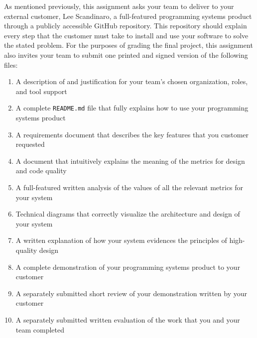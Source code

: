 As mentioned previously, this assignment asks your team to deliver to your external customer, Lee Scandinaro, a
full-featured programming systems product through a publicly accessible GitHub repository. This repository should
explain every step that the customer must take to install and use your software to solve the stated problem. For the
purposes of grading the final project, this assignment also invites your team to submit one printed and signed version
of the following files:

\vspace*{-.1in}
\begin{enumerate}
  \itemsep0em
  \item A description of and justification for your team's chosen organization, roles, and tool support
  \item A complete {\tt README.md} file that fully explains how to use your programming systems product
  \item A requirements document that describes the key features that you customer requested
  \item A document that intuitively explains the meaning of the metrics for design and code quality
  \item A full-featured written analysis of the values of all the relevant metrics for your system
  \item Technical diagrams that correctly visualize the architecture and design of your system
  \item A written explanation of how your system evidences the principles of high-quality design
  \item A complete demonstration of your programming systems product to your customer
  \item A separately submitted short review of your demonstration written by your customer
  \item A separately submitted written evaluation of the work that you and your team completed
\end{enumerate}
\vspace*{-.1in}


